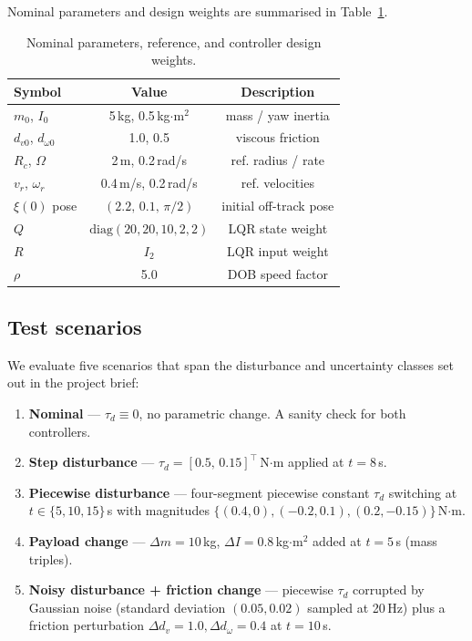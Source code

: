 \documentclass[conference]{IEEEtran}
\begin{document}
Nominal parameters and design weights are summarised in
Table~\ref{tab:params}.

\begin{table}[t]
  \centering
  \caption{Nominal parameters, reference, and controller design weights.}
  \label{tab:params}
  \begin{tabular}{lcc}
    \toprule
    Symbol & Value & Description\\
    \midrule
    $m_0$, $I_0$ & 5\,kg, 0.5\,kg$\cdot$m$^2$ & mass / yaw inertia\\
    $d_{v0}$, $d_{\omega 0}$ & 1.0, 0.5 & viscous friction\\
    $R_c$, $\Omega$ & 2\,m, 0.2\,rad/s & ref. radius / rate\\
    $v_r$, $\omega_r$ & 0.4\,m/s, 0.2\,rad/s & ref. velocities\\
    $\xi(0)$ pose & $(2.2,\,0.1,\,\pi/2)$ & initial off-track pose\\
    $Q$ & $\mathrm{diag}(20,20,10,2,2)$ & LQR state weight\\
    $R$ & $I_2$ & LQR input weight\\
    $\rho$ & 5.0 & DOB speed factor\\
    \bottomrule
  \end{tabular}
\end{table}

\subsection{Test scenarios}

We evaluate five scenarios that span the disturbance and uncertainty
classes set out in the project brief:

\begin{enumerate}\setlength\itemsep{2pt}
\item[(S1)] \textbf{Nominal} --- $\tau_d\equiv 0$, no parametric change. A
sanity check for both controllers.
\item[(S2)] \textbf{Step disturbance} ---
$\tau_d=[0.5,\,0.15]^\top$\,N$\cdot$m applied at $t=8$\,s.
\item[(S3)] \textbf{Piecewise disturbance} --- four-segment piecewise
constant $\tau_d$ switching at $t\in\{5,10,15\}$\,s with magnitudes
$\{(0.4,0),(-0.2,0.1),(0.2,-0.15)\}$\,N$\cdot$m.
\item[(S4)] \textbf{Payload change} --- $\Delta m=10$\,kg,
$\Delta I=0.8$\,kg$\cdot$m$^2$ added at $t=5$\,s (mass triples).
\item[(S5)] \textbf{Noisy disturbance + friction change} --- piecewise
$\tau_d$ corrupted by Gaussian noise (standard deviation
$(0.05,0.02)$ sampled at 20\,Hz) plus a friction perturbation
$\Delta d_v=1.0,\Delta d_\omega=0.4$ at $t=10$\,s.
\end{enumerate}
\end{document}
